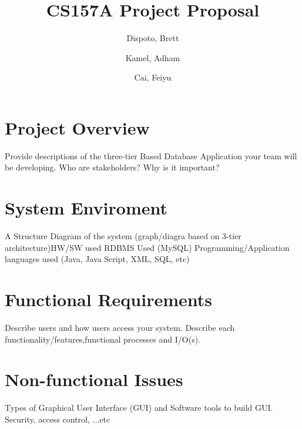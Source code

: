 \documentclass[titlepage]{article}
\author{ Dispoto, Brett\\
	\and
	Kamel, Adham\\
	\and
	Cai, Feiyu\\
}
\title{CS157A Project Proposal}
\begin{document}
	\maketitle
	
	\section{Project Overview}
	Provide descriptions of the three-tier Based Database Application your team will be developing. Who are stakeholders? Why is it important?   	
	\section{System Enviroment}
	A Structure Diagram of the system (graph/diagra based on 3-tier architecture)HW/SW used RDBMS Used (MySQL) Programming/Application
languages used (Java, Java Script,  XML, SQL, etc)	
	\section{Functional Requirements}
	Describe users and how users access your system. Describe each functionality/features,functional processes and I/O(s).	
	\section{Non-functional Issues}
Types of Graphical User Interface (GUI) and Software tools to build GUI. Security, access control, ...etc
\end{document}
